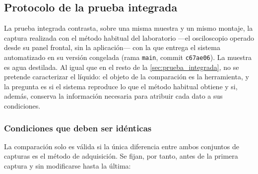 
\subsection{Protocolo de la prueba integrada}
\label{sec:protocolo_prueba}

La prueba integrada contrasta, sobre una misma muestra y un mismo
montaje, la captura realizada con el método habitual del laboratorio
---el osciloscopio operado desde su panel frontal, sin la
aplicación--- con la que entrega el sistema automatizado en su versión
congelada (rama \texttt{main}, commit \texttt{c67ae06}). La muestra es
agua destilada. Al igual que en el resto de la \cref{sec:prueba_integrada},
no se pretende caracterizar el líquido: el objeto de la comparación es
la herramienta, y la pregunta es si el sistema reproduce lo que el
método habitual obtiene y si, además, conserva la información necesaria
para atribuir cada dato a sus condiciones.

\subsubsection*{Condiciones que deben ser idénticas}

La comparación solo es válida si la única diferencia entre ambos
conjuntos de capturas es el método de adquisición. Se fijan, por tanto,
antes de la primera captura y sin modificarse hasta la última:

